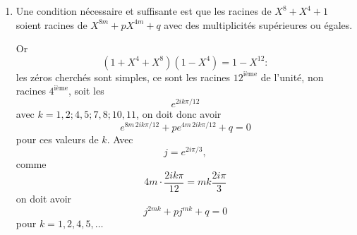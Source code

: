 \begin{enumerate}[label=\arabic*.,leftmargin=2.2em,itemsep=1.1em]
Comme il est clair que si $(P,Q)$ est une solution, $(\varepsilon_1P,\varepsilon_2Q)$ avec $\varepsilon_1$ et $\varepsilon_2$ égaux à 1 ou $-1$ en est une autre, on suppose
\[
\lambda=\frac1n\qquad\text{et}\qquad Q=\frac{P'}n.
\]

On cherche $P$ polynôme de degré $n$, vérifiant
\[
P^2=1+(X^2-1)\frac{P'^2}{n^2},
\]
ou encore
\[
(1-x^2)P'^2-n^2(1-P^2)=0.
\]

L'équation différentielle
\[
\frac{y'}{\sqrt{1-y^2}}=\pm\frac n{\sqrt{1-x^2}}
\]
que doit vérifier la restriction, $y$, de $P$ à $]-1,1[$, conduit à
\[
\operatorname{Arcsin}y=\pm(n\operatorname{Arcsin}x+k)
\]
et à
\[
y=\pm\sin(n\operatorname{Arcsin}x+k)
\]
soit à
\[
y=\pm[\sin(n\operatorname{Arcsin}x)\cos k+\cos(n\operatorname{Arcsin}x)\sin k].
\]

Un calcul classique conduit à
\[
\sin n\theta=C_n^1\cos^{n-1}\theta\sin\theta-C_n^3\cos^{n-3}\theta\sin^3\theta+\cdots
\]
et à
\[
\cos n\theta=\cos^n\theta-C_n^2\cos^{n-2}\theta\sin^2\theta+\cdots
\]
Si $n$ est pair, les $\cos^{n-2k-1}(\operatorname{Arcsin}x)$ contiendront $\sqrt{1-x^2}$ en facteur, ce ne sera pas un polynôme, donc $\cos k$ doit être nul, de même $n$ impair impose $\sin k$ nul et on trouve :

si $n=2p$, $P(X)$ doit être du type $\pm\cos(2p\operatorname{Arcsin}x)$ sur $]-1,1[$

et si $n=2p+1$, $P(X)$ doit être du type $\pm\sin((2p+1)\operatorname{Arcsin}x)$ sur $]-1,1[$.

Il reste à vérifier que ces polynômes vérifient la relation du départ, (car on a dérivé), avec
\[
Q=\frac\varepsilon nP',\qquad(\varepsilon\in\{-1,1\}).
\]

Si par exemple
\[
P=\varepsilon_1\cos(2p\operatorname{Arcsin}x),
\]
alors
\[
Q=-\frac{\varepsilon\varepsilon_1}{2p}\frac{2p\sin(2p\operatorname{Arcsin}x)}{\sqrt{1-x^2}}
\]
et
\[
P^2+(1-x^2)Q^2=\cos^2(2p\operatorname{Arcsin}x)+\sin^2(2p\operatorname{Arcsin}x)=1.
\]
On vérifierait de même que la solution trouvée dans le cas $n=2p+1$ convient.

\item Une condition nécessaire et suffisante est que les racines de $X^8+X^4+1$ soient racines de $X^{8m}+pX^{4m}+q$ avec des multiplicités supérieures ou égales.

Or
\[
(1+X^4+X^8)(1-X^4)=1-X^{12} :
\]
les zéros cherchés sont simples, ce sont les racines $12^\text{ième}$ de l'unité, non racines $4^\text{ième}$, soit les
\[
e^{2ik\pi/12}
\]
avec $k=1,2;4,5;7,8;10,11$, on doit donc avoir
\[
e^{8m\,2ik\pi/12}+pe^{4m\,2ik\pi/12}+q=0
\]
pour ces valeurs de $k$. Avec
\[
j=e^{2i\pi/3},
\]
comme
\[
4m\cdot\frac{2ik\pi}{12}=mk\frac{2i\pi}{3}
\]
on doit avoir
\[
j^{2mk}+pj^{mk}+q=0
\]
pour $k=1,2,4,5,\ldots$


\end{enumerate}
